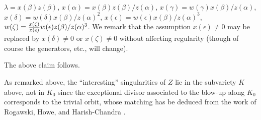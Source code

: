 $\lambda=x(\beta)z(\beta)$, $x(\alpha)=x(\beta)z(\beta)/z(\alpha)$,
$x(\gamma)=w(\gamma)x(\beta)/z(\alpha)$,
$x(\delta)=w(\delta)x(\beta)/z(\alpha)^2$,
$x(\epsilon)=w(\epsilon)x(\beta)/z(\alpha)^3$,
$w(\zeta)={x(\zeta)\over x(\epsilon)} w(\epsilon)z(\beta) /z(\alpha)^3$.
We remark that the assumption $x(\epsilon)\not=0$ may be
replaced by $x(\delta)\not= 0$ or $x(\zeta)\not= 0$ 
without affecting regularity (though
of course the generators, etc., will change). 
\par
The above claim follows.
\par
As remarked above, the ``interesting'' singularities of $Z$ 
lie in the subvariety $K$ above, not in $K_0$ since the exceptional 
divisor associated to the blow-up along $K_0$ corresponds to the trivial orbit,
whose matching has be deduced from the 
work of Rogawski, Howe, and Harish-Chandra \cite{Ro}.


